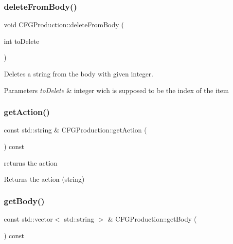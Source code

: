 \subsubsection{\texorpdfstring{delete\+From\+Body()}{deleteFromBody()}\hspace{0.1cm}{\footnotesize\ttfamily [2/2]}}
{\footnotesize\ttfamily void C\+F\+G\+Production\+::delete\+From\+Body (\begin{DoxyParamCaption}\item[{int}]{to\+Delete }\end{DoxyParamCaption})}



Deletes a string from the body with given integer. 


\begin{DoxyParams}{Parameters}
{\em to\+Delete} & integer wich is supposed to be the index of the item \\
\hline
\end{DoxyParams}
\mbox{\label{classCFGProduction_ab3f316c20cbd8cb70c43131bc0f3c8d7}} 
\subsubsection{\texorpdfstring{get\+Action()}{getAction()}}
{\footnotesize\ttfamily const std\+::string \& C\+F\+G\+Production\+::get\+Action (\begin{DoxyParamCaption}{ }\end{DoxyParamCaption}) const}



returns the action 

\begin{DoxyReturn}{Returns}
the action (string) 
\end{DoxyReturn}
\mbox{\label{classCFGProduction_a6043cdd8820ea153c073eea0d21c7046}} 
\subsubsection{\texorpdfstring{get\+Body()}{getBody()}}
{\footnotesize\ttfamily const std\+::vector$<$ std\+::string $>$ \& C\+F\+G\+Production\+::get\+Body (\begin{DoxyParamCaption}{ }\end{DoxyParamCaption}) const}



